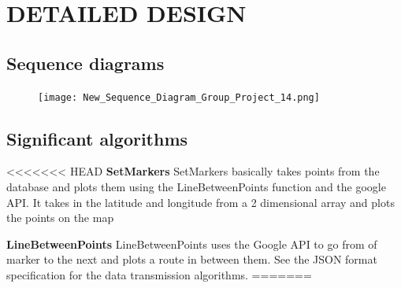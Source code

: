 \documentclass{project}
\begin{document}
\newpage

\section{DETAILED DESIGN}
\subsection{Sequence diagrams}

\begin{figure}[h] 

   
\texttt{[image: New\_Sequence\_Diagram\_Group\_Project\_14.png]}
    
\end{figure}

\newpage

\subsection{Significant algorithms}
<<<<<<< HEAD
\textbf{SetMarkers}
SetMarkers basically takes points from the database and plots them using the LineBetweenPoints function and the google API. It takes in the latitude and longitude from a 2 dimensional array and plots the points on the map

\textbf{LineBetweenPoints}
LineBetweenPoints uses the Google API to go from of marker to the next and plots a route in between them. See the JSON format specification for the data transmission algorithms.
=======
\end{document}
